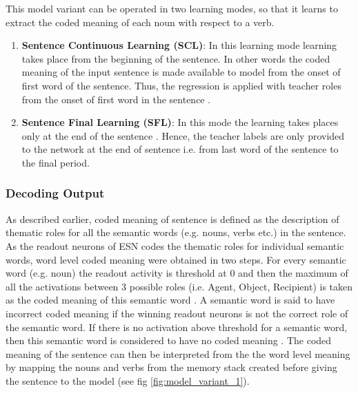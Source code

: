 This model variant can be operated in two learning modes, so that it learns to extract the coded meaning of each noun with respect to a verb.

\begin{enumerate}
\setlength{\itemsep}{\smallskipamount}

\item \textbf{Sentence Continuous Learning (SCL)}: In this learning mode learning takes place from the beginning of the sentence. In other words the coded meaning of the input sentence is made available to model from the onset of first word of the sentence. Thus, the regression is applied with teacher roles from the onset of first word in the sentence \cite{xavier:2013:RT}. \label{eg:SCL}

\item \textbf{Sentence Final Learning (SFL)}: In this mode the learning takes places only at the end of the sentence \cite{xavier:2013:RT}. Hence, the teacher labels are only provided to the network at the end of sentence i.e. from last word of the sentence to the final period. \label{eg:SFL}

\end{enumerate} 

\subsubsection{Decoding Output}

As described earlier, coded meaning of sentence is defined as the description of thematic roles for all the semantic words (e.g. nouns, verbs etc.) in the sentence. As the readout neurons of ESN codes the thematic roles for individual semantic words, word level coded meaning were obtained in two steps. For every semantic word (e.g. noun) the readout activity is threshold at 0 and then the maximum of all the activations between 3 possible roles (i.e. Agent, Object, Recipient) is taken as the coded meaning of this semantic word \cite{xavier:2013:RT}. A semantic word is said to have incorrect coded meaning if the winning readout neurons is not the correct role of the semantic word. If there is no activation above threshold for a semantic word, then this semantic word is considered to have no coded meaning \cite{xavier:2013:RT}. The coded meaning of the sentence can then be interpreted from the the word level meaning by mapping the nouns and verbs from the memory stack created before giving the sentence to the model (see fig \ref{fig:model_variant_1}).

